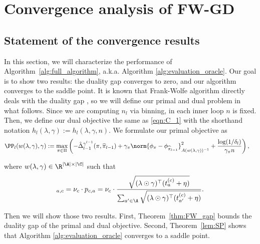 \documentclass{article}
\newcommand{\pill}{\widehat{\pi}_{l-1}}
\newcommand{\1}{\mathbf{1}}
\begin{document}
\section{Convergence analysis of \textsf{FW-GD}}\label{sec:conv_analysis}

\subsection{Statement of the convergence results}
In this section, we will characterize the performance of Algorithm~\ref{alg:full_algorithm}, a.k.a. Algorithm \ref{alg:evaluation_oracle}. 
Our goal is to show two results: the duality gap converges to zero, and our algorithm converges to the saddle point. It is known that Frank-Wolfe algorithm directly deals with the duality gap \cite{pedregosa2020linearly}, so we will define our primal and dual problem in what follows. Since we are computing $n_l$ via binning, in each inner loop $n$ is fixed. Then, we define our dual objective the same as \eqref{eqn:C_1} with the shorthand notation $h_l(\lambda,\gamma):=h_l(\lambda,\gamma,n)$. We formulate our primal objective as
\begin{align}
    \PP_l(w(\lambda,\gamma),\gamma)&:=\max_{\pi\in\Pi} \left(-\hat{\Delta}_{l-1}^{\gamma^{l-1}}(\pi,\pill)+\gamma_\pi\norm{\phi_\pi-\phi_{\pill}}_{A(w(\lambda,\gamma))^{-1}}^2+\frac{\log(1/\delta_l)}{\gamma_\pi n}\right)\label{eqn:PP_l},
\end{align}

where $w(\lambda,\gamma)\in \R^{|\A|\times |\C|}$ such that
\begin{equation}
    [w(\lambda,\gamma)]_{a, c}=\nu_{c} \cdot p_{c,a}=\nu_{c} \cdot \frac{\sqrt{(\lambda\odot\gamma)^{\top} (t_{a}^{(c)}+\eta)}}{\sum_{a'\in \A} \sqrt{(\lambda\odot\gamma)^{\top} (t_{a^{\prime}}^{(c)}+\eta)}}.
\end{equation}

Then we will show those two results. First, Theorem~\ref{thm:FW_gap} bounds the duality gap of the primal and dual objective. Second, Theorem~\ref{lem:SP} shows that Algorithm \ref{alg:evaluation_oracle} converges to a saddle point.
\end{document}
